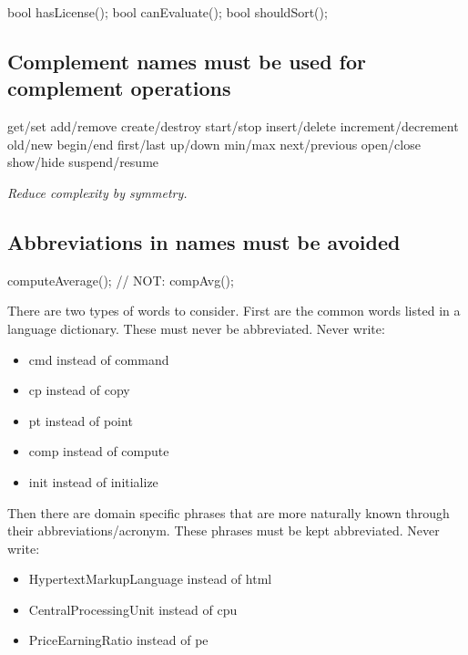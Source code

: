 \documentclass[a4paper,11pt,oneside]{scrbook}
\newcommand{\guideline}[1]{{\subsection{#1}}}
\newcommand{\motivation}[1]{{\normalfont \itshape #1}}
\begin{document}
\begin{code}
  bool hasLicense(); 
  bool canEvaluate(); 
  bool shouldSort(); 
\end{code}

\guideline{Complement names must be used for complement operations}

\begin{code}
  get/set
  add/remove
  create/destroy
  start/stop
  insert/delete
  increment/decrement
  old/new
  begin/end
  first/last
  up/down
  min/max
  next/previous
  open/close
  show/hide
  suspend/resume
\end{code}

\motivation{
  Reduce complexity by symmetry.
}

\guideline{Abbreviations in names must be avoided}

\begin{code}
  computeAverage();     // NOT: compAvg(); 
\end{code}

There are two types of words to consider. First are the common words listed in a
language dictionary. These must never be abbreviated. Never write:

\begin{itemize}
  \item
    cmd instead of command

  \item
    cp instead of copy

  \item
    pt instead of point

  \item
    comp instead of compute

  \item
    init instead of initialize
\end{itemize}

Then there are domain specific phrases that are more naturally known through
their abbreviations/acronym. These phrases must be kept abbreviated. Never
write:

\begin{itemize}
  \item
    HypertextMarkupLanguage instead of html

  \item
    CentralProcessingUnit instead of cpu

  \item
    PriceEarningRatio instead of pe
\end{itemize}
\end{document}
